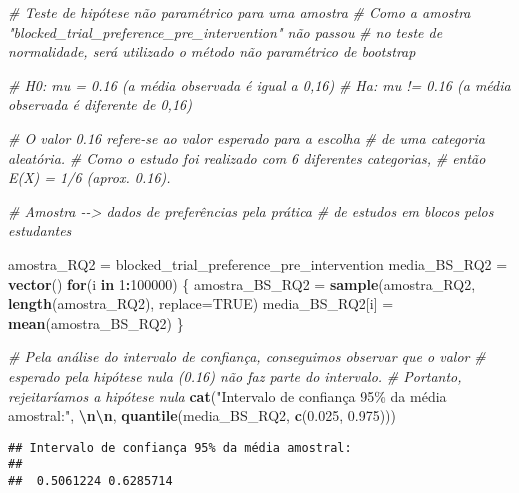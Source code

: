 \documentclass[
]{article}
\newenvironment{Shaded}{\begin{snugshade}}{\end{snugshade}}
\newcommand{\AttributeTok}[1]{\textcolor[rgb]{0.13,0.29,0.53}{#1}}
\newcommand{\CommentTok}[1]{\textcolor[rgb]{0.56,0.35,0.01}{\textit{#1}}}
\newcommand{\ConstantTok}[1]{\textcolor[rgb]{0.56,0.35,0.01}{#1}}
\newcommand{\ControlFlowTok}[1]{\textcolor[rgb]{0.13,0.29,0.53}{\textbf{#1}}}
\newcommand{\DecValTok}[1]{\textcolor[rgb]{0.00,0.00,0.81}{#1}}
\newcommand{\FloatTok}[1]{\textcolor[rgb]{0.00,0.00,0.81}{#1}}
\newcommand{\FunctionTok}[1]{\textcolor[rgb]{0.13,0.29,0.53}{\textbf{#1}}}
\newcommand{\NormalTok}[1]{#1}
\newcommand{\OtherTok}[1]{\textcolor[rgb]{0.56,0.35,0.01}{#1}}
\newcommand{\SpecialCharTok}[1]{\textcolor[rgb]{0.81,0.36,0.00}{\textbf{#1}}}
\newcommand{\StringTok}[1]{\textcolor[rgb]{0.31,0.60,0.02}{#1}}
\begin{document}
\begin{Shaded}
\begin{Highlighting}[]
\CommentTok{\# Teste de hipótese não paramétrico para uma amostra}
\CommentTok{\# Como a amostra "blocked\_trial\_preference\_pre\_intervention" não passou}
\CommentTok{\# no teste de normalidade, será utilizado o método não paramétrico de bootstrap}

\CommentTok{\# H0: mu = 0.16 (a média observada é igual a 0,16)}
\CommentTok{\# Ha: mu != 0.16 (a média observada é diferente de 0,16)}

\CommentTok{\# O valor 0.16 refere{-}se ao valor esperado para a escolha}
\CommentTok{\# de uma categoria aleatória.}
\CommentTok{\# Como o estudo foi realizado com 6 diferentes categorias,}
\CommentTok{\# então E(X) = 1/6 (aprox. 0.16).}

\CommentTok{\# Amostra {-}{-}\textgreater{} dados de preferências pela prática}
\CommentTok{\# de estudos em blocos pelos estudantes}

\NormalTok{amostra\_RQ2 }\OtherTok{=}\NormalTok{ blocked\_trial\_preference\_pre\_intervention}
\NormalTok{media\_BS\_RQ2 }\OtherTok{=} \FunctionTok{vector}\NormalTok{()}
\ControlFlowTok{for}\NormalTok{(i }\ControlFlowTok{in} \DecValTok{1}\SpecialCharTok{:}\DecValTok{100000}\NormalTok{)}
\NormalTok{\{}
\NormalTok{    amostra\_BS\_RQ2 }\OtherTok{=} \FunctionTok{sample}\NormalTok{(amostra\_RQ2, }\FunctionTok{length}\NormalTok{(amostra\_RQ2), }\AttributeTok{replace=}\ConstantTok{TRUE}\NormalTok{)}
\NormalTok{    media\_BS\_RQ2[i] }\OtherTok{=} \FunctionTok{mean}\NormalTok{(amostra\_BS\_RQ2)}
\NormalTok{\}}

\CommentTok{\# Pela análise do intervalo de confiança, conseguimos observar que o valor}
\CommentTok{\# esperado pela hipótese nula (0.16) não faz parte do intervalo.}
\CommentTok{\# Portanto, rejeitaríamos a hipótese nula}
\FunctionTok{cat}\NormalTok{(}\StringTok{"Intervalo de confiança 95\% da média amostral:"}\NormalTok{,}
    \StringTok{\textquotesingle{}}\SpecialCharTok{\textbackslash{}n\textbackslash{}n}\StringTok{\textquotesingle{}}\NormalTok{, }\FunctionTok{quantile}\NormalTok{(media\_BS\_RQ2, }\FunctionTok{c}\NormalTok{(}\FloatTok{0.025}\NormalTok{, }\FloatTok{0.975}\NormalTok{)))}
\end{Highlighting}
\end{Shaded}

\begin{verbatim}
## Intervalo de confiança 95% da média amostral: 
## 
##  0.5061224 0.6285714
\end{verbatim}
\end{document}
